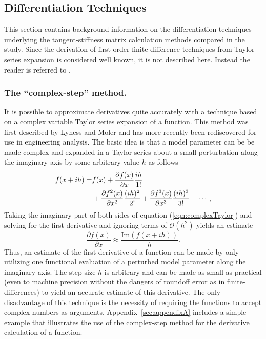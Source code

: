 \documentclass[preprint,12pt]{elsarticle}
\begin{document}
\subsection{Differentiation Techniques}

This section contains background information on the differentiation techniques underlying the tangent-stiffness matrix calculation methods compared in the study. Since the derivation of first-order finite-difference techniques from Taylor series expansion is considered well known, it is not described here. Instead the reader is referred to \cite[Chap. 4.1.3]{chapra2010}.

\subsubsection{The ``complex-step'' method.}  \label{sec:CSmethod} It is
possible to approximate derivatives quite accurately with a technique based on
a complex variable Taylor series expansion of a function.  This method was
first described by Lyness and Moler
\cite{lyness1967numerical,lyness1968differentiation} and has more recently been
rediscovered
\cite{squire1998using,voorhees2011complex,al2010complex,martins2000automated}
for use in engineering analysis.  The basic idea is that a model parameter can
be be made complex and expanded in a Taylor series about a small perturbation
along the imaginary axis by some arbitrary value $h$ as follows
%
\begin{align} f ( x + i h ) =& f(x) + \frac{\partial f(x)}{\partial x} \frac{i
h}{1!}  \notag \\ &+ \frac{\partial f^2(x)}{\partial x^2} \frac{(i h)^2}{2!} +
\frac{\partial f^3(x)}{\partial x^3} \frac{(i h)^3}{3!} + \cdots,
\label{eqn:complexTaylor} \end{align}
%
Taking the imaginary part of both sides of equation (\ref{eqn:complexTaylor})
and solving for the first derivative and ignoring terms of $\mathcal{O}\left (
h^2 \right)$ yields an estimate
%
\begin{equation} \frac{\partial f( x )}{\partial x} \approx \frac{\mbox{Im}
\left( f (x + i h) \right)}{h}.  \label{eqn:complexFirstDeriv} \end{equation}
%
Thus, an estimate of the first derivative of a function can be made by only
utilizing one functional evaluation of a perturbed model parameter along the
imaginary axis.  The step-size $h$ is arbitrary and can be made as small as
practical (even to machine precision without the dangers of roundoff error as
in finite-differences) to yield an accurate estimate of this derivative.  The
only disadvantage of this technique is the necessity of requiring the functions
to accept complex numbers as arguments. Appendix~\ref{sec:appendixA} includes a
simple example that illustrates the use of the complex-step method for the
derivative calculation of a function. 
\end{document}
